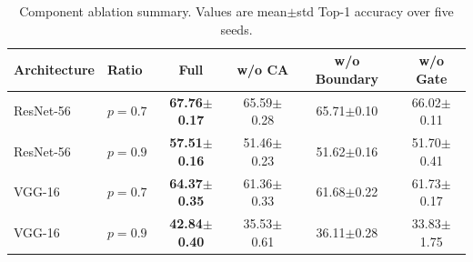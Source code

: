 \begin{table}[t]
\caption{Component ablation summary. Values are mean$\pm$std Top-1 accuracy over five seeds.}
\label{tab:ablation_summary_ivc}
\scriptsize
\setlength{\tabcolsep}{4.0pt}
\begin{tabular*}{\textwidth}{@{\extracolsep\fill}llcccc}
\toprule
Architecture & Ratio & Full & w/o CA & w/o Boundary & w/o Gate \\
\midrule
ResNet-56 & $p=0.7$ & \textbf{67.76$\pm$0.17} & 65.59$\pm$0.28 & 65.71$\pm$0.10 & 66.02$\pm$0.11 \\
ResNet-56 & $p=0.9$ & \textbf{57.51$\pm$0.16} & 51.46$\pm$0.23 & 51.62$\pm$0.16 & 51.70$\pm$0.41 \\
VGG-16 & $p=0.7$ & \textbf{64.37$\pm$0.35} & 61.36$\pm$0.33 & 61.68$\pm$0.22 & 61.73$\pm$0.17 \\
VGG-16 & $p=0.9$ & \textbf{42.84$\pm$0.40} & 35.53$\pm$0.61 & 36.11$\pm$0.28 & 33.83$\pm$1.75 \\
\bottomrule
\end{tabular*}
\end{table}
